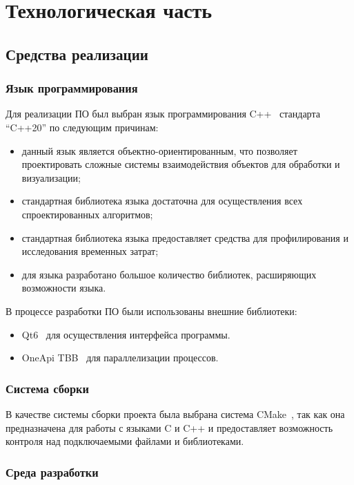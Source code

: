 \chapter{Технологическая часть}

\section{Средства реализации}

\subsection*{Язык программирования}

Для реализации ПО был выбран язык программирования C++~\cite{cpp} стандарта ``C++20'' по следующим причинам:
\begin{itemize}
  \item данный язык является объектно-ориентированным, что позволяет проектировать сложные системы взаимодействия объектов для обработки и визуализации;
  \item стандартная библиотека языка достаточна для осуществления всех спроектированных алгоритмов;
  \item стандартная библиотека языка предоставляет средства для профилирования и исследования временных затрат;
  \item для языка разработано большое количество библиотек, расширяющих возможности языка. 
\end{itemize}

В процессе разработки ПО были использованы внешние библиотеки:
\begin{itemize}
  \item Qt6~\cite{qt} для осуществления интерфейса программы.
  \item OneApi TBB~\cite{tbb} для параллелизации процессов.
\end{itemize}

\subsection*{Система сборки}

В качестве системы сборки проекта была выбрана система CMake~\cite{CMake}, так как она предназначена для работы с языками C и C++ и предоставляет возможность контроля над подключаемыми файлами и библиотеками.

\subsection*{Среда разработки}


